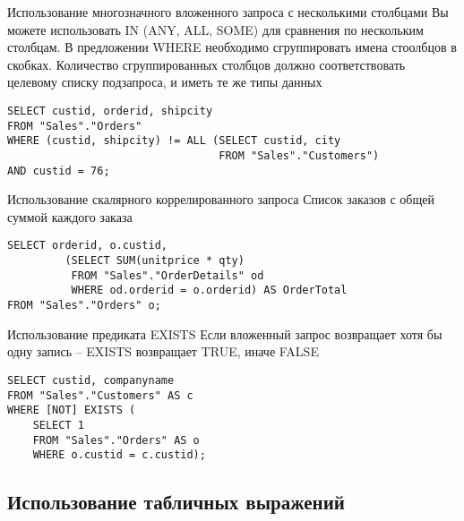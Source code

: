 \documentclass[12pt]{article}
\begin{document}
\begin{Example}{Использование многозначного вложенного запроса с несколькими столбцами}
    Вы можете использовать IN (ANY, ALL, SOME) для сравнения по нескольким столбцам. В предложении WHERE необходимо сгруппировать имена стоолбцов в скобках. Количество сгруппированных столбцов должно соответствовать целевому списку подзапроса, и иметь те же типы данных 

\begin{lstlisting}
SELECT custid, orderid, shipcity
FROM "Sales"."Orders"
WHERE (custid, shipcity) != ALL (SELECT custid, city
                                 FROM "Sales"."Customers")
AND custid = 76;
\end{lstlisting}
\end{Example}

\begin{Example}{Использование скалярного коррелированного запроса}
    Список заказов с общей суммой каждого заказа 

\begin{lstlisting}
SELECT orderid, o.custid,
         (SELECT SUM(unitprice * qty)
          FROM "Sales"."OrderDetails" od
          WHERE od.orderid = o.orderid) AS OrderTotal
FROM "Sales"."Orders" o;
\end{lstlisting}
\end{Example}

\begin{Example}{Использование предиката EXISTS}
    Если вложенный запрос возвращает хотя бы одну запись -- EXISTS возвращает TRUE, иначе FALSE

\begin{lstlisting}
SELECT custid, companyname
FROM "Sales"."Customers" AS c 
WHERE [NOT] EXISTS (
    SELECT 1 
    FROM "Sales"."Orders" AS o 
    WHERE o.custid = c.custid);
\end{lstlisting}
\end{Example}

\newpage 

\subsection{Использование табличных выражений}
\end{document}
